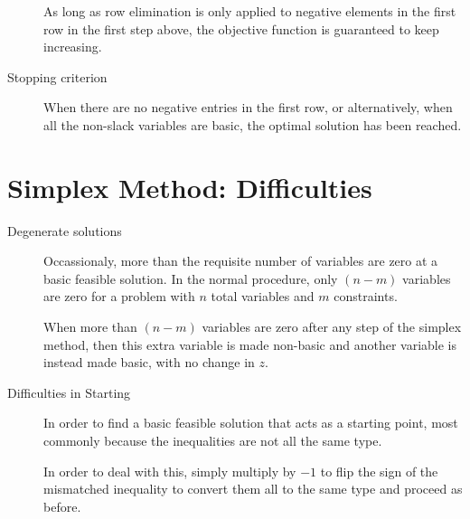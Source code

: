 \begin{description}
        As long as row elimination is only applied to negative elements in the first row
        in the first step above, the objective function is guaranteed to keep increasing.

    \item[Stopping criterion] When there are no negative entries in the first row,
        or alternatively, when all the non-slack variables are basic, the optimal
        solution has been reached.
\end{description}

\section{Simplex Method: Difficulties}

\begin{description}
    \item[Degenerate solutions] Occassionaly, more than the requisite number of variables
        are zero at a basic feasible solution. In the normal procedure, only $ (n-m) $
        variables are zero for a problem with $ n $ total variables and $ m $
        constraints. \par
        When more than $ (n-m) $ variables are zero after any step of the simplex method,
        then this extra variable is made non-basic and another variable is instead made
        basic, with no change in $ z $.

    \item[Difficulties in Starting] In order to find a basic feasible solution that acts
        as a starting point, most commonly because the inequalities are not all the
        same type. \par
        In order to deal with this, simply multiply by $ -1 $ to flip the sign of the
        mismatched inequality to convert them all to the same type and proceed as before.
\end{description}